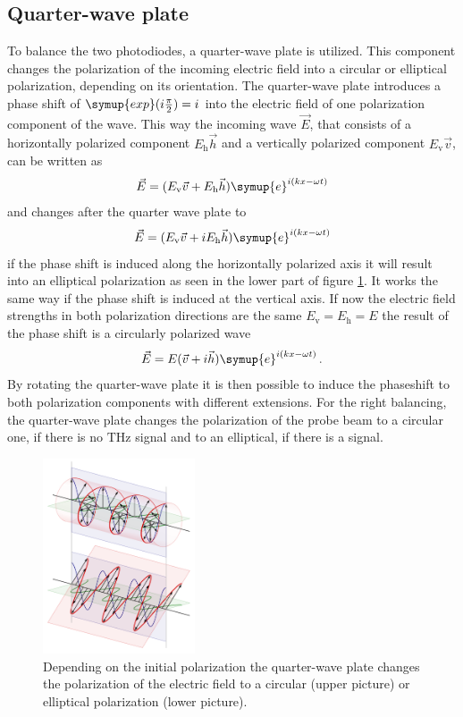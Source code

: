 \subsection{Quarter-wave plate}
\label{sec:qwp}
To balance the two photodiodes, a quarter-wave plate is utilized.
This component changes the polarization of the incoming electric field into a circular or elliptical polarization, depending on its orientation.
The quarter-wave plate introduces a phase shift of $\symup{exp}(i\frac{\pi}{2}) = i$ into the electric field of one polarization component of the wave.
This way the incoming wave $\vec{E}$, that consists of a horizontally polarized component $E_\text{h}\vec{h}$ and a vertically polarized component $E_\text{v}\vec{v}$, can be written as
\begin{equation}
    \vec{E} = (E_\text{v}\vec{v} + E_\text{h}\vec{h})\symup{e}^{i(kx-\omega t)}
\end{equation}
and changes after the quarter wave plate to 
\begin{equation}
    \vec{E} = (E_\text{v}\vec{v} + i E_\text{h}\vec{h})\symup{e}^{i(kx-\omega t)}
\end{equation}
if the phase shift is induced along the horizontally polarized axis it will result into an elliptical polarization as seen in the lower part of figure \ref{fig:qwp}.
It works the same way if the phase shift is induced at the vertical axis.
If now the electric field strengths in both polarization directions are the same $E_\text{v} = E_\text{h} = E$ the result of the phase shift is a circularly polarized wave \cite{qwp_book}
\begin{equation}
    \vec{E} = E(\vec{v} + i\vec{h})\symup{e}^{i(kx-\omega t)} \, .
\end{equation}
By rotating the quarter-wave plate it is then possible to induce the phaseshift to both polarization components with different extensions.
For the right balancing, the quarter-wave plate changes the polarization of the probe beam to a circular one, if there is no $\si{\tera\hertz}$ signal and to an elliptical, if there is a signal.
\begin{figure}
    \centering
    \includegraphics[width=0.4\textwidth]{refferenced_pic/qwp.png}
    \caption{Depending on the initial polarization the quarter-wave plate changes the polarization of the electric field to a circular (upper picture) or elliptical polarization (lower picture).}
    \label{fig:qwp}
\end{figure}
\FloatBarrier
